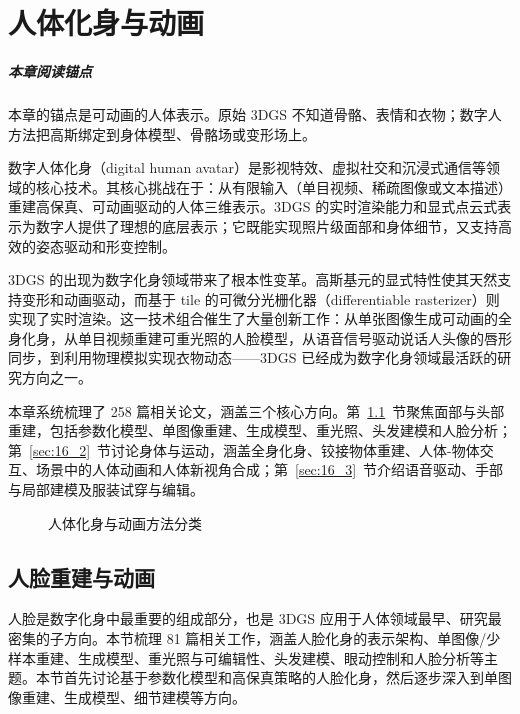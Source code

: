 \chapter{人体化身与动画}
\label{ch:16}

\paragraph*{本章阅读锚点}
本章的锚点是可动画的人体表示。原始 3DGS 不知道骨骼、表情和衣物；数字人方法把高斯绑定到身体模型、骨骼场或变形场上。


数字人体化身（digital human avatar）是影视特效、虚拟社交和沉浸式通信等领域的核心技术。其核心挑战在于：从有限输入（单目视频、稀疏图像或文本描述）重建高保真、可动画驱动的人体三维表示。3DGS 的实时渲染能力和显式点云式表示为数字人提供了理想的底层表示；它既能实现照片级面部和身体细节，又支持高效的姿态驱动和形变控制。

3DGS 的出现为数字化身领域带来了根本性变革。高斯基元的显式特性使其天然支持变形和动画驱动，而基于 tile 的可微分光栅化器（differentiable rasterizer）则实现了实时渲染。这一技术组合催生了大量创新工作：从单张图像生成可动画的全身化身，从单目视频重建可重光照的人脸模型，从语音信号驱动说话人头像的唇形同步，到利用物理模拟实现衣物动态——3DGS 已经成为数字化身领域最活跃的研究方向之一。

本章系统梳理了 258 篇相关论文，涵盖三个核心方向。第~\ref{sec:16_1}~节聚焦面部与头部重建，包括参数化模型、单图像重建、生成模型、重光照、头发建模和人脸分析；第~\ref{sec:16_2}~节讨论身体与运动，涵盖全身化身、铰接物体重建、人体-物体交互、场景中的人体动画和人体新视角合成；第~\ref{sec:16_3}~节介绍语音驱动、手部与局部建模及服装试穿与编辑。

\begin{figure}[htbp]
\centering
\resizebox{\textwidth}{!}{}
\caption{人体化身与动画方法分类}
\label{fig:ch16_avatar_taxonomy}
\end{figure}

\section{人脸重建与动画}
\label{sec:16_1}

人脸是数字化身中最重要的组成部分，也是 3DGS 应用于人体领域最早、研究最密集的子方向。本节梳理 81 篇相关工作，涵盖人脸化身的表示架构、单图像/少样本重建、生成模型、重光照与可编辑性、头发建模、眼动控制和人脸分析等主题。本节首先讨论基于参数化模型和高保真策略的人脸化身，然后逐步深入到单图像重建、生成模型、细节建模等方向。

